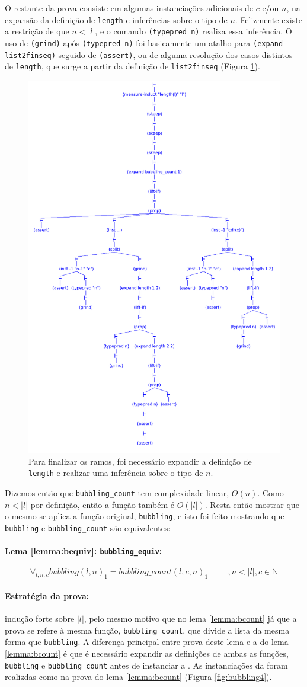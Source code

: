 O restante da prova consiste em algumas instanciações adicionais de $c$ e/ou $n$, 
na expansão da definição de \texttt{length} e inferências sobre o tipo de $n$.
Felizmente existe a restrição de que $n < |l|$, e o comando \texttt{(typepred n)}
realiza essa inferência. O uso de \texttt{(grind)} após \texttt{(typepred n)}
foi basicamente um atalho para \texttt{(expand list2finseq)}
seguido de \texttt{(assert)}, ou de alguma resolução dos casos distintos
de \texttt{length}, que surge a partir da definição de \texttt{list2finseq}
(Figura \ref{fig:bubbling3}).

\begin{figure}[h!]
    \centering
    \includegraphics[width=0.25\linewidth,trim={20.5cm 10cm 0cm 18.5cm},clip]{figures/bubbling-counts-n.png}
    \caption{Para finalizar os ramos, foi necessário expandir a definição de
    \texttt{length} e realizar uma inferência sobre o tipo de $n$.}
    \label{fig:bubbling3}
\end{figure}


Dizemos então que \texttt{bubbling\_count} tem complexidade linear, $O(n)$.
Como $n<|l|$ por definição, então a função também é $O(|l|)$.
Resta então mostrar que o mesmo
se aplica a função original, \texttt{bubbling}, e isto foi feito mostrando que
\texttt{bubbling} e \texttt{bubbling\_count} são equivalentes:

\paragraph{Lema \ref{lemma:bequiv}: \texttt{bubbling\_equiv}:} 
\begin{equation*}
    \forall_{l,n,c} bubbling(l, n)_1 = bubbling\_count(l, c, n)_1 \hspace{1cm}, n<|l|, c\in \mathbb{N}
\end{equation*}

\paragraph{Estratégia da prova:} indução forte sobre $|l|$, pelo mesmo motivo
que no lema \ref{lemma:bcount} já que a prova se refere à mesma função,
\texttt{bubbling\_count}, que divide a lista da mesma forma que
\texttt{bubbling}. A diferença principal entre prova deste lema e a do lema
\ref{lemma:bcount} é que é necessário expandir as definições de ambas as
funções, \texttt{bubbling} e \texttt{bubbling\_count} antes de instanciar
a \HI. As instanciações da \HI foram realizdas como na prova do
lema \ref{lemma:bcount} (Figura \ref{fig:bubbling4}).

